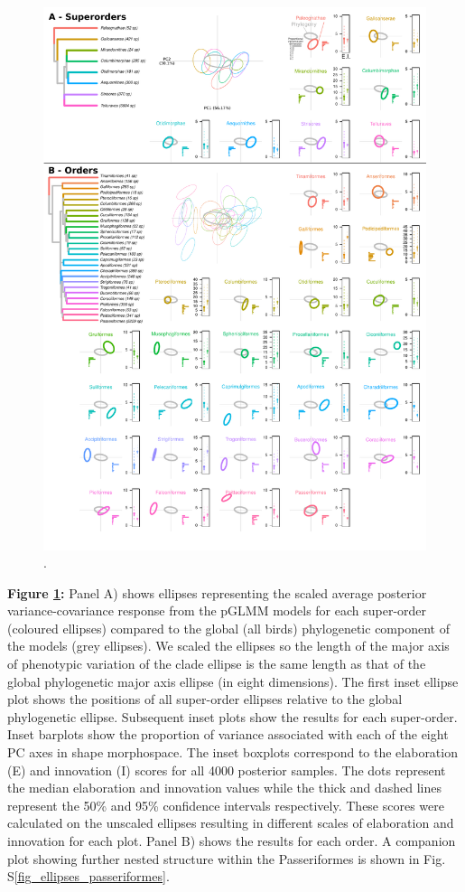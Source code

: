\documentclass[12pt,letterpaper]{article}
\begin{document}
\begin{figure}[!htbp]
\centering
   \includegraphics[width=1\textwidth]{Figures/ellipses.pdf}
\caption{.}
\label{Fig:ellipses}
\end{figure}
\bigskip

\noindent \textbf{Figure \ref{Fig:ellipses}:}
Panel A) shows ellipses representing the scaled average posterior variance-covariance response from the pGLMM models for each super-order (coloured ellipses) compared to the global (all birds) phylogenetic component of the models (grey ellipses).
We scaled the ellipses so the length of the major axis of phenotypic variation of the clade ellipse is the same length as that of the global phylogenetic major axis ellipse (in eight dimensions).
The first inset ellipse plot shows the positions of all super-order ellipses relative to the global phylogenetic ellipse.
Subsequent inset plots show the results for each super-order. 
Inset barplots show the proportion of variance associated with each of the eight PC axes in shape morphospace.
The inset boxplots correspond to the elaboration (E) and innovation (I) scores for all 4000 posterior samples.
The dots represent the median elaboration and innovation values while the thick and dashed lines represent the 50\% and 95\% confidence intervals respectively.
These scores were calculated on the unscaled ellipses resulting in different scales of elaboration and innovation for each plot.
Panel B) shows the results for each order.
A companion plot showing further nested structure within the Passeriformes is shown in Fig. S\ref{fig_ellipses_passeriformes}.
\end{document}
